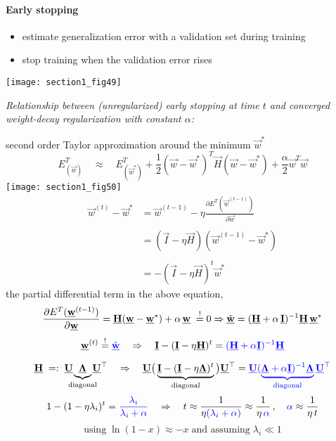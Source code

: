 \paragraph{Early stopping}
\begin{itemize}
\item estimate generalization error with a validation set during training
\item stop training when the validation error rises
\end{itemize}
\begin{center}
		\texttt{[image: section1\_fig49]}
	\end{center}
\textit{Relationship between (unregularized) early stopping at time $t$ 
		and converged weight-decay regularization with constant $\alpha$: }
\begin{itemize}
\itr second order Taylor approximation around the minimum $\vec w^*$
\begin{equation}
			E^T_{(\vec{w})} \quad\approx\quad
			E^T_{(\vec{w}^*)} + \frac{1}{2} (\vec{w} - \vec{w}^*)^T \vec{H}(\vec{w}-\vec{w}^*)+\frac{\alpha}{2}\vec{w}^T
\vec{w}
\end{equation}
\texttt{[image: section1\_fig50]}
\begin{equation}
\begin{array}{ll}
\vec w^{(t)} - \vec w^*
&=\vec w^{(t-1)} - \eta \frac{\partial E^T{(\vec w^{(t-1)})}}{\partial\vec w}\\\\
&=(\vec I - \eta \vec H)(\vec w^{(t-1)} - \vec w^*) \\\\
&=-(\vec I - \eta \vec H)^t \vec w^*
\end{array}
\end{equation}
\itr the partial differential term in the above equation, 
\begin{equation}
\frac{\partial E^T{(\vec w^{(t-1)})}}{\partial\vec w}\\
= \vec H (\vec w - \vec w^*) + \alpha \, \vec w 
					\; \stackrel{!}{=}0 \\
\Rightarrow \tilde{\vec{w}} = (\vec H + \alpha \, \vec I)^{-1} \vec H \, \vec w^*
\end{equation}
\itr 
$$ 
			\vec w^{(t)} \stackrel{!}{=} {\color{blue}\tilde{\vec w}}
			\quad\Rightarrow\quad 
			\vec I  - (\vec I - \eta \vec H)^t 
			= {\color{blue}(\vec H + \alpha \vec I)^{-1} \vec H}
$$

$$
			\vec H \;=:\; \vec U \kern-1.5ex 
				\underbrace{\vec \Lambda }_{\text{diagonal}} 
			\kern-1.5ex\vec U^\top
			\quad\Rightarrow\quad
			\vec U \big( \underbrace{\vec I - (\vec I - \eta \vec \Lambda)^t 
				}_{\text{diagonal}}\big) \vec U^\top
			= {\color{blue} \vec U (\underbrace{
					\vec \Lambda + \alpha \vec I)^{-1}	\vec \Lambda 
				}_{\text{diagonal}} \vec U^\top }
$$
$$
			1 - (1 - \eta \lambda_i)^t = 
			{\color{blue} \frac{\lambda_i}{\lambda_i + \alpha}}
			\quad\Rightarrow\quad t \approx 
			\frac{1}{\eta {\color{blue} (\lambda_i+\alpha) }}
			\approx \frac{1}{\eta \, {\color{blue} \alpha} } \,,
			\quad {\color{blue}\alpha} \approx \frac{1}{\eta \, t}
$$
{\tiny $$
			\text{using}\; \ln(1-x) \approx -x \;
			\text{and assuming}\; \lambda_i \ll 1
$$}
\end{itemize}
